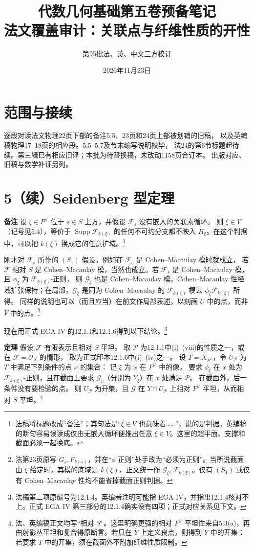 \documentclass[openany,fontset=fandol]{ctexbook}
\DeclareMathOperator{\Supp}{Supp}
\newcommand{\OO}{\mathcal O}
\newcommand{\FF}{\mathcal F}
\newcommand{\GG}{\mathcal G}
\newcommand{\calP}{\mathcal P}
\newcommand{\tagitem}[2]{\par\medskip\noindent\textbf{#1\quad #2}\enspace}
\begin{document}
\title{代数几何基础第五卷预备笔记\\法文覆盖审计：关联点与纤维性质的开性}
\author{第95批\quad 法、英、中文三方校订}
\date{2026年11月23日}
\maketitle

\section*{范围与接续}
逐段对读法文物理22页下部的备注5.5、23页和24页上部被划销的旧稿，
以及英编稿物理17--18页的相应段。5.5--5.7及节末编写说明校毕，
法24的第6节标题起待续。第三辑已有相应旧译；本批为待替换稿，未改动1158页合订本。
出版对应、旧稿与数学补证另列。

\section*{5（续）\quad Seidenberg 型定理}
\tagitem{备注}{5.5}
设 $\xi\in P^\vee$ 位于 $s\in S$ 上方，并假设 $\FF_s$ 没有嵌入的关联素循环。
则 $\xi\in V$（记号见5.4），等价于 $\Supp\FF_{k(\xi)}$ 的任何不可约分支都不映入
$H_\xi$。在这个判据中，可以把 $k(\xi)$ 换成它的任意扩域。\footnote{法稿将标题改成“备注”；其句法是“$\xi\in V$ 也意味着……”，说的是判据。英编稿的断句容易误读成仅由无嵌入循环便推出任意 $\xi\in V$。这里的超平面、支撑和截面必须一起换底。}

刚才对 $\FF_s$ 所作的 $(S_1)$ 假设，例如在 $\FF_s$ 是 Cohen--Macaulay 模时就成立，
若 $\FF$ 相对 $S$ 是 Cohen--Macaulay 模，当然也成立。若 $\FF_s$ 是
Cohen--Macaulay 模，且 $\phi_\xi$ 为 $\FF_{k(\xi)}$-正则，
则 $\GG_\xi$ 也是 Cohen--Macaulay 模。Cohen--Macaulay 性经域扩张保持；在局部，$\GG_\xi$ 是同为 Cohen--Macaulay 的
$\FF_{k(\xi)}$ 模去 $\phi_\xi\FF_{k(\xi)}$ 所得。
同样的说明也可以（而且应当）在前文作局部表述，以刻画 $U$ 中的点，而非 $V$ 中的点。\footnote{法第23页原写 $G_s,F_{k(s)}$，并在“$\phi$ 正则”处手改为“必须为正则”。当所说截面由 $\xi$ 给定时，其模的底域是 $k(\xi)$，正文统一作 $\GG_\xi,\FF_{k(\xi)}$。仅有 $(S_1)$ 或仅有 Cohen--Macaulay 性均不能省掉截面正则判据。}

现在用正式 EGA IV 的12.1.1和12.1.6得到以下结论。\footnote{法稿第二项原编号为12.1.4。英编者注明可能指 EGA IV，并指出12.1.4核对不上。正式 EGA IV 第三部分的12.1.4确实没有四项；正式对应关系见下文。}

\tagitem{定理}{5.6}
假设 $\FF$ 有限表示且相对 $S$ 平坦。
取 $\calP$ 为12.1.1中(i)--(viii)的性质之一，或在 $\FF=\OO_X$ 的情形，
取为正式印本12.1.6中(i)--(iv)之一。
设 $T=X_{P^\vee}$，令 $U_{\calP}$ 为 $T$ 中满足下列条件的点 $x$ 的集合：
记 $\xi$ 为 $x$ 在 $P^\vee$ 中的像，
要求 $\phi_\xi$ 在 $x$ 处为 $\FF_{k(\xi)}$-正则，且在截面上要求
$\GG_\xi$（分别为 $Y_\xi$）在 $x$ 处满足 $\calP$。
在截面外，后一条件没有要检验的点。
则 $U_{\calP}$ 为开集，且 $\GG$ 在 $Y\cap U_{\calP}$ 上相对 $P^\vee$ 平坦，从而相对 $S$ 平坦。\footnote{法、英编稿正文均写“相对 $S$”。这里明确更强的相对 $P^\vee$ 平坦性来自5.3(a)，再由射影丛平坦和复合得原断言。若只在 $Y$ 上定义良点，则得到 $Y$ 中的开集；若要求 $T$ 中的开集，须在截面外不附加纤维性质限制。}
\end{document}
